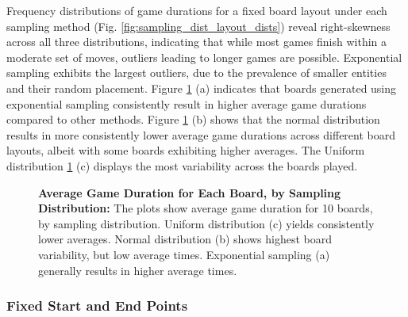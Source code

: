 Frequency distributions of game durations for a fixed board layout under each sampling method (Fig. \ref{fig:sampling_dist_layout_dists}) reveal right-skewness across all three distributions, indicating that while most games finish within a moderate set of moves, outliers leading to longer games are possible. Exponential sampling exhibits the largest outliers, due to the prevalence of smaller entities and their random placement. Figure \ref{fig:sampling_dist_board_avg_times} (a) indicates that boards generated using exponential sampling consistently result in higher average game durations compared to other methods. Figure \ref{fig:sampling_dist_board_avg_times} (b) shows that the normal distribution results in more consistently lower average game durations across different board layouts, albeit with some boards exhibiting higher averages. The Uniform distribution \ref{fig:sampling_dist_board_avg_times} (c) displays the most variability across the boards played.


\begin{figure}[ht]
	\centering
	\linebreak
	\caption{\textbf{Average Game Duration for Each Board, by Sampling Distribution:} The plots show average game duration for 10 boards, by sampling distribution. Uniform distribution (c) yields consistently lower averages. Normal distribution (b) shows highest board variability, but low average times. Exponential sampling (a) generally results in higher average times.}
	\label{fig:sampling_dist_board_avg_times}
\end{figure}


\subsubsection{Fixed Start and End Points}


